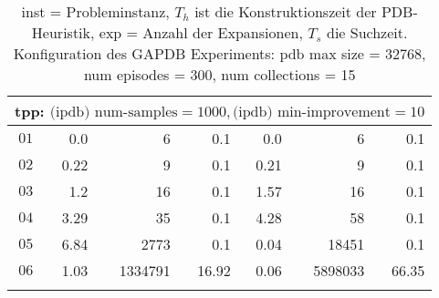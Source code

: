 \begin{longtable}{|c||r|r|r||r|r|r|}
\multicolumn{7}{|l|}{tpp: $\text{(ipdb) num-samples}=1000,\text{(ipdb) min-improvement}=10$}\\\hline
$01$ & 0.0 & 6 & 0.1 &0.0 & 6 & 0.1 \\\hline
$02$ & 0.22 & 9 & 0.1 &0.21 & 9 & 0.1 \\\hline
$03$ & 1.2 & 16 & 0.1 &1.57 & 16 & 0.1 \\\hline
$04$ & 3.29 & 35 & 0.1 &4.28 & 58 & 0.1 \\\hline
$05$ & 6.84 & 2773 & 0.1 &0.04 & 18451 & 0.1 \\\hline
$06$ & 1.03 & 1334791 & 16.92 &0.06 & 5898033 & 66.35 \\\hline

\caption{inst = Probleminstanz, $T_h$ ist die Konstruktionszeit der PDB-Heuristik, exp = Anzahl der Expansionen, $T_s$ die Suchzeit. Konfiguration des GAPDB Experiments: pdb max size = 32768, num episodes = 300, num collections = 15}
\end{longtable}